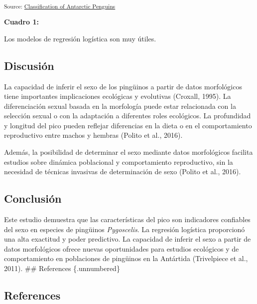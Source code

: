 \documentclass[
]{agujournal2019}
\begin{document}
\textsubscript{Source:
\href{https://sofiazorrilla.github.io/articulo_ping-inos/notebooks/ClassificationModel-preview.html\#cell-tbl-res}{Classification
of Antarctic Penguins}}

\textbf{Cuadro 1:}

Los modelos de regresión logística son muy útiles.

\subsection{Discusión}\label{discusiuxf3n}

La capacidad de inferir el sexo de los pingüinos a partir de datos
morfológicos tiene importantes implicaciones ecológicas y evolutivas
(Croxall, 1995). La diferenciación sexual basada en la morfología puede
estar relacionada con la selección sexual o con la adaptación a
diferentes roles ecológicos. La profundidad y longitud del pico pueden
reflejar diferencias en la dieta o en el comportamiento reproductivo
entre machos y hembras (Polito et al., 2016).

Además, la posibilidad de determinar el sexo mediante datos morfológicos
facilita estudios sobre dinámica poblacional y comportamiento
reproductivo, sin la necesidad de técnicas invasivas de determinación de
sexo (Polito et al., 2016).

\subsection{Conclusión}\label{conclusiuxf3n}

Este estudio demuestra que las características del pico son indicadores
confiables del sexo en especies de pingüinos \emph{Pygoscelis}. La
regresión logística proporcionó una alta exactitud y poder predictivo.
La capacidad de inferir el sexo a partir de datos morfológicos ofrece
nuevas oportunidades para estudios ecológicos y de comportamiento en
poblaciones de pingüinos en la Antártida (Trivelpiece et al., 2011).
\#\# References \{.unnumbered\}

\subsection{References}\label{references}
\end{document}
